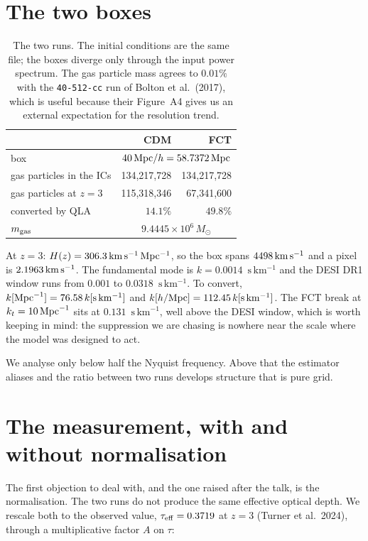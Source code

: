 \documentclass[11pt,a4paper]{article}
\newcommand{\kv}{\ensuremath{\mathrm{s\,km^{-1}}}}
\newcommand{\taueff}{\ensuremath{\tau_{\rm eff}}}
\newcommand{\code}[1]{\texttt{\small #1}}
\begin{document}
\section{The two boxes}

\begin{table}[h]
\centering
\begin{tabular}{lrr}
\toprule
 & CDM & FCT \\
\midrule
box                       & \multicolumn{2}{c}{$40\,{\rm Mpc}/h = 58.7372\,{\rm Mpc}$} \\
gas particles in the ICs  & 134{,}217{,}728 & 134{,}217{,}728 \\
gas particles at $z=3$    & 115{,}318{,}346 & 67{,}341{,}600 \\
converted by QLA          & $14.1\%$ & $49.8\%$ \\
$m_{\rm gas}$             & \multicolumn{2}{c}{$9.4445\times10^{6}\,M_\odot$} \\
\bottomrule
\end{tabular}
\caption{The two runs. The initial conditions are the same file; the boxes
diverge only through the input power spectrum. The gas particle mass agrees
to $0.01\%$ with the \code{40-512-cc} run of Bolton et al.~(2017), which is
useful because their Figure~A4 gives us an external expectation for the
resolution trend.}
\end{table}

At $z=3$: $H(z) = 306.3\,{\rm km\,s^{-1}\,Mpc^{-1}}$, so the box spans
$4498\,{\rm km\,s^{-1}}$ and a pixel is $2.1963\,{\rm km\,s^{-1}}$. The
fundamental mode is $k = 0.0014$~\kv{} and the DESI DR1 window runs from
$0.001$ to $0.0318$~\kv{}. To convert, $k[{\rm Mpc}^{-1}] = 76.58\,k[\kv]$
and $k[h/{\rm Mpc}] = 112.45\,k[\kv]$. The FCT break at
$k_t = 10\,{\rm Mpc}^{-1}$ sits at $0.131$~\kv{}, well above the DESI
window, which is worth keeping in mind: the suppression we are chasing is
nowhere near the scale where the model was designed to act.

We analyse only below half the Nyquist frequency. Above that the estimator
aliases and the ratio between two runs develops structure that is pure
grid.

\section{The measurement, with and without normalisation}
\label{sec:t0}

The first objection to deal with, and the one raised after the talk, is the
normalisation. The two runs do not produce the same effective optical
depth. We rescale both to the observed value,
$\taueff = 0.3719$ at $z=3$ (Turner et al.~2024), through a multiplicative
factor $A$ on $\tau$:
\end{document}
